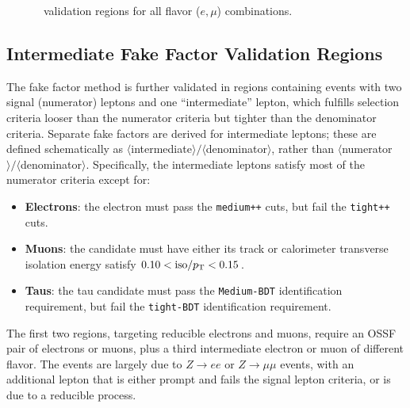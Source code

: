 \begin{figure}[tbp]
  \caption{\ttbar\ validation regions for all flavor ($e, \mu$) combinations.}
  \label{fig:model-independent-VR-ttbar}
\end{figure}

\subsection{Intermediate Fake Factor Validation Regions}\label{sec:model-independent-validation-regions-intermediate-ff}
The fake factor method is further validated in regions containing events with two signal (numerator) leptons and one ``intermediate'' lepton, which fulfills selection criteria looser than the numerator criteria but tighter than the denominator criteria. Separate fake factors are derived for intermediate leptons; these are defined schematically as $\langle$intermediate$\rangle/\langle$denominator$\rangle$, rather than $\langle$numerator$\rangle/\langle$denominator$\rangle$. Specifically, the intermediate leptons satisfy most of the numerator criteria except for:

\begin{itemize}
	\item \textbf{Electrons}: the electron must pass the \texttt{medium++} cuts, but fail the \texttt{tight++} cuts.  
	\item \textbf{Muons}: the candidate must have either its track or calorimeter transverse isolation energy
	satisfy $0.10 < \mathrm{iso}/p_{\text{T}} < 0.15$.
	\item \textbf{Taus}: the tau candidate must pass the \texttt{Medium-BDT} identification requirement, but fail the
	\texttt{tight-BDT} identification requirement.
\end{itemize}

The first two regions, targeting reducible electrons and muons, require an OSSF pair of electrons or muons, plus a third intermediate electron or muon of different flavor. The events are largely due to $Z\rightarrow ee$ or $Z\rightarrow \mu\mu$ events, with an additional lepton that is either prompt and fails the signal lepton criteria, or is due to a reducible process. 

